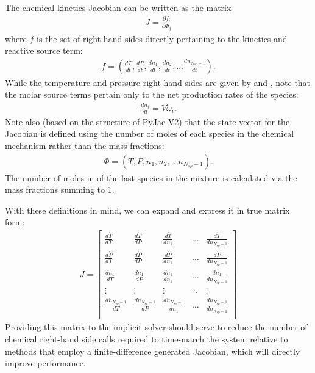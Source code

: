 The chemical kinetics Jacobian can be written as the matrix
\begin{align}
J = \frac{\partial f_{i}}{\partial \Phi_{j}} \label{eq:jac}
\end{align}
where $f$ is the set of right-hand sides directly pertaining
to the kinetics and reactive source term:
\begin{align}
f = \left(\frac{dT}{dt}, \frac{dP}{dt}, \frac{dn_{1}}{dt}, \frac{dn_{2}}{dt}, \hdots \frac{dn_{N_{sp}-1}}{dt} \right).
\end{align}
While the temperature and pressure right-hand sides are given by  and ,
note that the molar source terms pertain only to the net production rates of the species:
\begin{align}
\frac{dn_{i}}{dt} = V \dot{\omega}_{i}.
\end{align}
Note also (based on the structure of PyJac-V2) that the state vector for the
Jacobian is defined using the number of moles of each species in the chemical
mechanism rather than the mass fractions:
\begin{align}
\Phi = \left(T, P, n_{1}, n_{2}, \hdots n_{N_{sp}-1}\right).
\end{align}
The number of moles in of the last species in the mixture is calculated
via the mass fractions summing to 1.

With these definitions in mind, we can expand  and express
it in true matrix form:
\begin{align}
J = \begin{bmatrix} \frac{d\dot{T}}{dT} & \frac{d\dot{T}}{dP} & \frac{d\dot{T}}{dn_{1}} & \hdots & \frac{d\dot{T}}{dn_{N_{sp}-1}} \\
                    \frac{d\dot{P}}{dT} & \frac{d\dot{P}}{dP} & \frac{d\dot{P}}{dn_{1}} & \hdots & \frac{d\dot{P}}{dn_{N_{sp}-1}} \\
		    \frac{d\dot{n}_{1}}{dT} & \frac{d\dot{n}_{1}}{dP} & \frac{d\dot{n}_{1}}{dn_{1}} & \hdots & \frac{d\dot{n}_{1}}{dn_{N_{sp}-1}} \\
		    \vdots & \vdots & \vdots & \ddots & \vdots \\
		    \frac{d\dot{n}_{N_{sp}-1}}{dT} & \frac{d\dot{n}_{N_{sp}-1}}{dP} & \frac{d\dot{n}_{N_{sp}-1}}{dn_{1}} & \hdots & \frac{d\dot{n}_{N_{sp}-1}}{dn_{N_{sp}-1}} \\
    \end{bmatrix}
\end{align}
Providing this matrix to the implicit solver should serve to reduce the
number of chemical right-hand side calls required to time-march the
system relative to methods that employ a finite-difference generated
Jacobian, which will directly improve performance.

